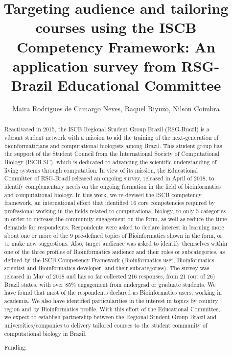 \documentclass[twoside]{article}
\title{\vspace{-15mm}\fontsize{24pt}{10pt}\selectfont\textbf{ Targeting audience and tailoring courses using the ISCB Competency Framework: An application survey from RSG-Brazil Educational Committee }} %
\author{ Maira Rodrigues de Camargo Neves, Raquel Riyuzo, Nilson Coimbra }
\affil{ Universidade Federal de Minas Gerais }
\date{}
\begin{document}
  
  
  \maketitle %
  
  
  \thispagestyle{fancy} %
  
  
  \begin{abstract}
  Reactivated in 2015,  the ISCB Regional Student Group Brazil (RSG-Brazil) is a vibrant student
network with a mission to aid the training of the next-generation of bioinformaticians and
computational biologists among Brazil. This student group has the support of the Student
Council from the International Society of Computational Biology (ISCB-SC),  which is
dedicated to advancing the scientific understanding of living systems through computation. In
view of its mission,  the Educational Committee of RSG-Brazil released an ongoing survey, 
released in April of 2018,  to identify complementary needs on the ongoing formation in the
field of bioinformatics and computational biology. In this work,  we re-devised the ISCB
competency framework,  an international effort that identified 16 core competencies required
by professional working in the fields related to computational biology,  to only 5 categories in
order to increase the community engagement on the form,  as well as reduce the time demands
for respondents. Respondents were asked to declare interest in learning more about one or more
of the 9 pre-defined topics of Bioinformatics shown in the form,  or to make new suggestions.
Also,  target audience was asked to identify themselves within one of the three profiles of
Bioinformatics audience and their roles or subcategories,  as defined by the ISCB Competency
Framework (Bioinformatics user,  Bioinformatics scientist and Bioinformatics developer,  and
their subcategories). The survey was released in May of 2018 and has so far collected 216
responses,  from 21 (out of 26) Brazil states,  with over 85\% engagement from undergrad or
graduate students. We have found that most of the respondents declared as Bioinformatics
users,  working in academia. We also have identified particularities in the interest in topics by
country region and by Bioinformatics profile. With this effort of the Educational Committee, 
we expect to establish partnership between the Regional Student Group Brazil and
universities/companies to delivery tailored courses to the student community of computational
biology in Brazil.
  
  Funding:  \\ 
  \end{abstract}
  
\end{document}
